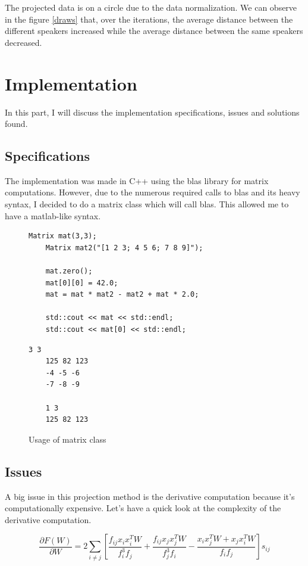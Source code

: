 \documentclass{techrep}
\begin{document}
The projected data is on a circle due to the data normalization.  We can
observe in the figure \ref{draws} that, over the iterations, the
average distance between the different speakers increased while the
average distance between the same speakers decreased.

\section{Implementation}
In this part, I will discuss the implementation specifications, issues
and solutions found.

\subsection{Specifications}

The implementation was made in C++ using the blas library for matrix
computations.  However, due to the numerous required calls to blas and
its heavy syntax, I decided to do a matrix class which will call blas.
This allowed me to have a matlab-like syntax.


\lstset{language=c++}
\begin{figure}[H]
  \begin{lstlisting}[frame=single, caption=Source]
    Matrix mat(3,3);
    Matrix mat2("[1 2 3; 4 5 6; 7 8 9]");

    mat.zero();
    mat[0][0] = 42.0;
    mat = mat * mat2 - mat2 + mat * 2.0;

    std::cout << mat << std::endl;
    std::cout << mat[0] << std::endl;
  \end{lstlisting}

  \begin{lstlisting}[frame=single, caption=Output]
    3 3
    125 82 123
    -4 -5 -6
    -7 -8 -9

    1 3
    125 82 123
  \end{lstlisting}
  \caption{Usage of matrix class}
  \label{algo_matrix}
\end{figure}

\subsection{Issues}

A big issue in this projection method is the derivative computation
because it's computationally expensive.
Let's have a quick look at the complexity of the derivative computation.

$$\frac{\partial{F(W)}}{\partial{W}} =
2\sum_{i\neq{}j}\left[\frac{f_{ij}x_ix_i^TW}{f_i^3f_j} +
  \frac{f_{ij}x_jx_j^TW}{f_j^3f_i} - \frac{x_ix_j^TW + x_jx_i^TW}{f_if_j}\right]s_{ij}$$
\end{document}
